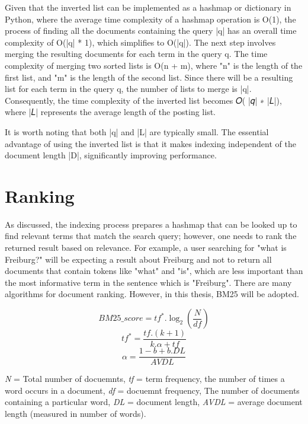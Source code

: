 Given that the inverted list can be implemented as a hashmap or dictionary in Python, where the average time complexity of a hashmap operation is O(1), the process of finding all the documents containing the query |q| has an overall time complexity of O(|q| * 1), which simplifies to O(|q|). The next step involves merging the resulting documents for each term in the query q. The time complexity of merging two sorted lists is O(n + m), where "n" is the length of the first list, and "m" is the length of the second list. Since there will be a resulting list for each term in the query q, the number of lists to merge is |q|. Consequently, the time complexity of the inverted list becomes 𝑂( |𝑞| ∗ |𝐿|), where |𝐿| represents the average length of the posting list.

It is worth noting that both |q| and |L| are typically small. The essential advantage of using the inverted list is that it makes indexing independent of the document length |D|, significantly improving performance.

\section{Ranking}
\label{sec:ranking}
As discussed, the indexing process prepares a hashmap that can be looked up to find relevant terms that match the search query; however, one needs to rank the returned result based on relevance. For example, a user searching for "what is Freiburg?" will be expecting a result about Freiburg and not to return all documents that contain tokens like "what" and "is", which are less important than the most informative term in the sentence which is "Freiburg". There are many algorithms for document ranking. However, in this thesis, BM25 will be adopted. 

\begin{equation}
BM25\_score = tf^*.\log_2(\frac{N}{df})
\label{eq:depth}
\end{equation}
\begin{equation}
tf^* = \frac{tf.(k+1)}{k.\alpha+tf}
\label{eq:depth}
\end{equation}
\begin{equation}
\alpha = \frac{1-b+b.DL}{AVDL}
\label{eq:depth}
\end{equation}

\textit{N} = Total number of docuemnts, \textit{tf} = term frequency, the number of times a word occurs in a document, \textit{df} = docuemnt frequency, The number of documents containing a particular word, \textit{DL} = document length, \textit{AVDL} =
average document length (measured in number of words).

